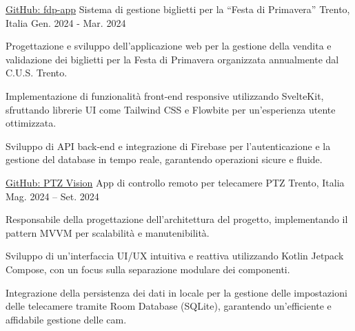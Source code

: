 

\begin{cventries}

  \cventry
    {\href{https://github.com/Festa-di-Primavera/fdp-app}{GitHub: fdp-app}} %
    {Sistema di gestione biglietti per la ``Festa di Primavera''} %
    {Trento, Italia} %
    {Gen. 2024 - Mar. 2024} %
    {
      \begin{cvitems} %
        \item {Progettazione e sviluppo dell'applicazione web per la gestione della vendita e validazione dei biglietti per la Festa di Primavera organizzata annualmente dal C.U.S. Trento.}
        \item {Implementazione di funzionalità front-end responsive utilizzando SvelteKit, sfruttando librerie UI come Tailwind CSS e Flowbite per un'esperienza utente ottimizzata.}
        \item {Sviluppo di API back-end e integrazione di Firebase per l'autenticazione e la gestione del database in tempo reale, garantendo operazioni sicure e fluide.}
      \end{cvitems}
    }

\cventry
{
    \href{https://github.com/PTZ-Vision/PTZ-Vision-Android}{GitHub: PTZ Vision}} %
    {App di controllo remoto per telecamere PTZ} %
    {Trento, Italia} %
    {Mag. 2024 – Set. 2024} %
    {
    \begin{cvitems} 
        \item {Responsabile della progettazione dell'architettura del progetto, implementando il pattern MVVM per scalabilità e manutenibilità.}
        \item {Sviluppo di un'interfaccia UI/UX intuitiva e reattiva utilizzando Kotlin Jetpack Compose, con un focus sulla separazione modulare dei componenti.}
        \item {Integrazione della persistenza dei dati in locale per la gestione delle impostazioni delle telecamere tramite Room Database (SQLite), garantendo un'efficiente e affidabile gestione delle cam.}
    \end{cvitems} 
    }



\end{cventries}
